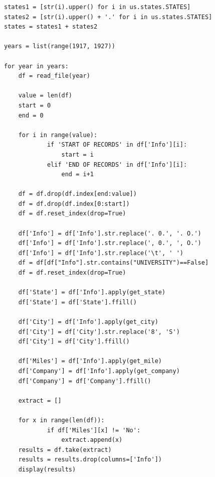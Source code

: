 \begin{lstlisting}
states1 = [str(i).upper() for i in us.states.STATES]
states2 = [str(i).upper() + '.' for i in us.states.STATES]
states = states1 + states2

years = list(range(1917, 1927))

for year in years:
    df = read_file(year)
    
    value = len(df)
    start = 0
    end = 0
    
    for i in range(value):
            if 'START OF RECORDS' in df['Info'][i]:
                start = i
            elif 'END OF RECORDS' in df['Info'][i]:
                end = i+1

    df = df.drop(df.index[end:value])
    df = df.drop(df.index[0:start])
    df = df.reset_index(drop=True)
    
    df['Info'] = df['Info'].str.replace('. 0.', '. O.')
    df['Info'] = df['Info'].str.replace(', 0.', ', O.')
    df['Info'] = df['Info'].str.replace('\t', ' ')
    df = df[df["Info"].str.contains("UNIVERSITY")==False]
    df = df.reset_index(drop=True)
    
    df['State'] = df['Info'].apply(get_state)
    df['State'] = df['State'].ffill()
    
    df['City'] = df['Info'].apply(get_city)
    df['City'] = df['City'].str.replace('8', 'S')
    df['City'] = df['City'].ffill()

    df['Miles'] = df['Info'].apply(get_mile)
    df['Company'] = df['Info'].apply(get_company)
    df['Company'] = df['Company'].ffill()
    
    extract = []
    
    for x in range(len(df)):
            if df['Miles'][x] != 'No':
                extract.append(x)
    results = df.take(extract)
    results = results.drop(columns=['Info'])
    display(results)
\end{lstlisting}

